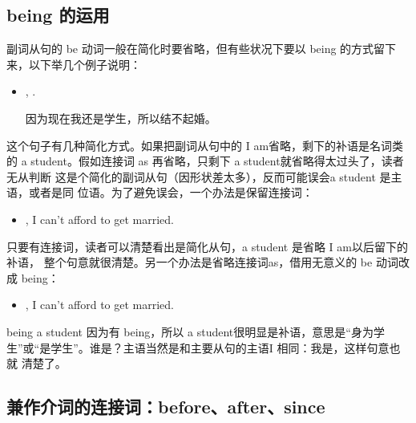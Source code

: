 \subsection{being 的运用}

副词从句的 be 动词一般在简化时要省略，但有些状况下要以 being
的方式留下来，以下举几个例子说明：
\begin{itemize}
\item {},  
  .

因为现在我还是学生，所以结不起婚。
\end{itemize}

这个句子有几种简化方式。如果把副词从句中的 I am省略，剩下的补语是名词类的 a
student。假如连接词 as 再省略，只剩下 a student就省略得太过头了，读者无从判断
这是个简化的副词从句（因形状差太多），反而可能误会a student 是主语，或者是同
位语。为了避免误会，一个办法是保留连接词：
\begin{itemize}
\item {}, I can't afford to get married.
\end{itemize}
只要有连接词，读者可以清楚看出是简化从句，a student 是省略 I am以后留下的补语，
整个句意就很清楚。另一个办法是省略连接词as，借用无意义的 be 动词改成 being：
\begin{itemize}
\item {}, I can't afford to get married.
\end{itemize}
being a student 因为有 being，所以 a student很明显是补语，意思是“身为学
生”或“是学生”。谁是？主语当然是和主要从句的主语I 相同：我是，这样句意也就
清楚了。

\subsection{兼作介词的连接词：before、after、since}

